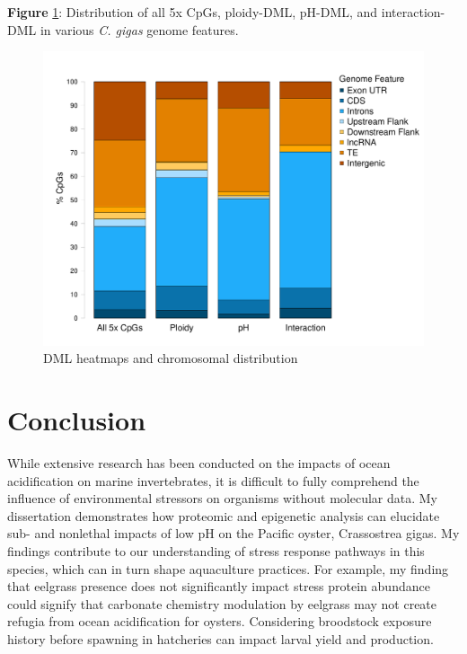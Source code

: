 \documentclass [11pt, proquest] {uwthesis}[2015/03/03]
\begin{document}
\textbf{Figure} \ref{fig:DMLgenomicloc}: Distribution of all 5x CpGs, ploidy-DML, pH-DML, and interaction-DML in various \emph{C. gigas} genome features.\newline
\begin{figure}[h]
\centering
  \includegraphics[width=1\textwidth]{figure/Ch4/Figure4.4.pdf}
  \caption{DML heatmaps and chromosomal distribution}
  \label{fig:DMLgenomicloc}
\end{figure}
\clearpage

\hypertarget{conclusion-4}{%
\chapter*{Conclusion}\label{conclusion-4}}

While extensive research has been conducted on the impacts of ocean acidification on marine invertebrates, it is difficult to fully comprehend the influence of environmental stressors on organisms without molecular data. My dissertation demonstrates how proteomic and epigenetic analysis can elucidate sub- and nonlethal impacts of low pH on the Pacific oyster, Crassostrea gigas. My findings contribute to our understanding of stress response pathways in this species, which can in turn shape aquaculture practices. For example, my finding that eelgrass presence does not significantly impact stress protein abundance could signify that carbonate chemistry modulation by eelgrass may not create refugia from ocean acidification for oysters. Considering broodstock exposure history before spawning in hatcheries can impact larval yield and production.
\end{document}
